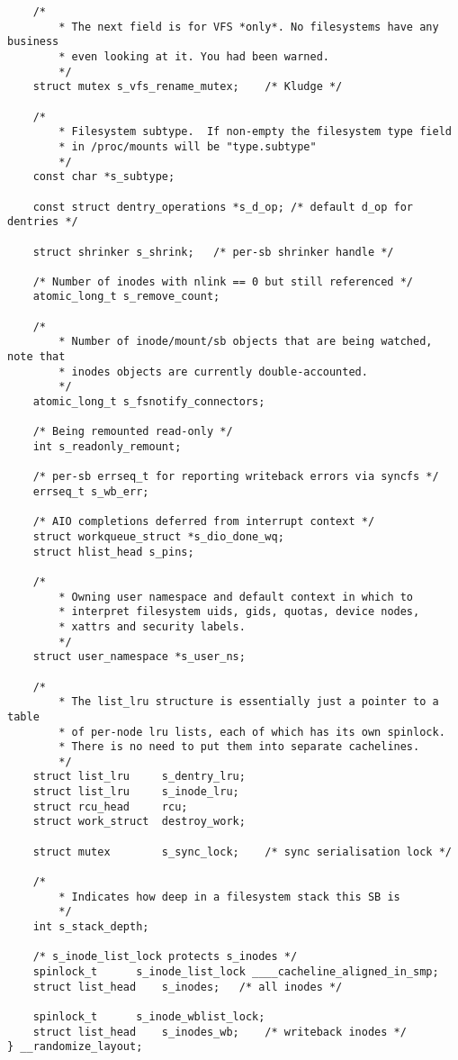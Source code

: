 \begin{lstlisting}
    /*
        * The next field is for VFS *only*. No filesystems have any business
        * even looking at it. You had been warned.
        */
    struct mutex s_vfs_rename_mutex;	/* Kludge */

    /*
        * Filesystem subtype.  If non-empty the filesystem type field
        * in /proc/mounts will be "type.subtype"
        */
    const char *s_subtype;

    const struct dentry_operations *s_d_op; /* default d_op for dentries */

    struct shrinker s_shrink;	/* per-sb shrinker handle */

    /* Number of inodes with nlink == 0 but still referenced */
    atomic_long_t s_remove_count;

    /*
        * Number of inode/mount/sb objects that are being watched, note that
        * inodes objects are currently double-accounted.
        */
    atomic_long_t s_fsnotify_connectors;

    /* Being remounted read-only */
    int s_readonly_remount;

    /* per-sb errseq_t for reporting writeback errors via syncfs */
    errseq_t s_wb_err;

    /* AIO completions deferred from interrupt context */
    struct workqueue_struct *s_dio_done_wq;
    struct hlist_head s_pins;

    /*
        * Owning user namespace and default context in which to
        * interpret filesystem uids, gids, quotas, device nodes,
        * xattrs and security labels.
        */
    struct user_namespace *s_user_ns;

    /*
        * The list_lru structure is essentially just a pointer to a table
        * of per-node lru lists, each of which has its own spinlock.
        * There is no need to put them into separate cachelines.
        */
    struct list_lru		s_dentry_lru;
    struct list_lru		s_inode_lru;
    struct rcu_head		rcu;
    struct work_struct	destroy_work;

    struct mutex		s_sync_lock;	/* sync serialisation lock */

    /*
        * Indicates how deep in a filesystem stack this SB is
        */
    int s_stack_depth;

    /* s_inode_list_lock protects s_inodes */
    spinlock_t		s_inode_list_lock ____cacheline_aligned_in_smp;
    struct list_head	s_inodes;	/* all inodes */

    spinlock_t		s_inode_wblist_lock;
    struct list_head	s_inodes_wb;	/* writeback inodes */
} __randomize_layout;
\end{lstlisting}
